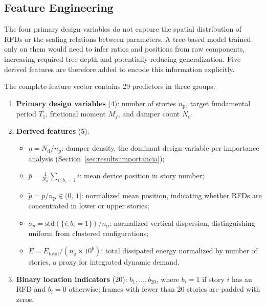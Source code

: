 \documentclass[preprint,12pt,authoryear]{elsarticle}
\newcommand{\nd}{N_{\mathrm{d}}}
\newcommand{\np}{n_{\mathrm{p}}}              %
\newcommand{\etad}{\eta}
\newcommand{\Mf}{M_{\!f}}
\begin{document}
\subsection{Feature Engineering}
\label{sec:method:features}

The four primary design variables do not capture the spatial distribution of RFDs or
the scaling relations between parameters. A tree-based model trained only on them would
need to infer ratios and positions from raw components, increasing required tree depth
and potentially reducing generalization. Five derived features are therefore added to
encode this information explicitly.

The complete feature vector contains 29 predictors in three groups:

\begin{enumerate}[label=\textit{\roman*})]
    \item \textbf{Primary design variables} (4):
          number of stories $\np$, target fundamental period $T_1$,
          frictional moment $\Mf$, and damper count $\nd$.

    \item \textbf{Derived features} (5):
    \begin{itemize}
        \item $\etad = \nd/\np$: damper density, the dominant design variable per
              importance analysis (Section~\ref{sec:results:importancia});
        \item $\bar{p} = \tfrac{1}{\nd}\sum_{i:\,b_i=1} i$: mean device position in
              story number;
        \item $\tilde{p} = \bar{p}/\np \in (0,\,1]$: normalized mean position,
              indicating whether RFDs are concentrated in lower or upper stories;
        \item $\sigma_p = \mathrm{std}\!\left(\{i:b_i=1\}\right)/\np$: normalized
              vertical dispersion, distinguishing uniform from clustered configurations;
        \item $\tilde{E} = E_{\mathrm{total}}/(\np\times10^6)$: total dissipated
              energy normalized by number of stories, a proxy for integrated dynamic
              demand.
    \end{itemize}

    \item \textbf{Binary location indicators} (20):
          $b_1,\ldots,b_{20}$, where $b_i=1$ if story $i$ has an RFD and $b_i=0$
          otherwise; frames with fewer than 20 stories are padded with zeros.
\end{enumerate}
\end{document}
